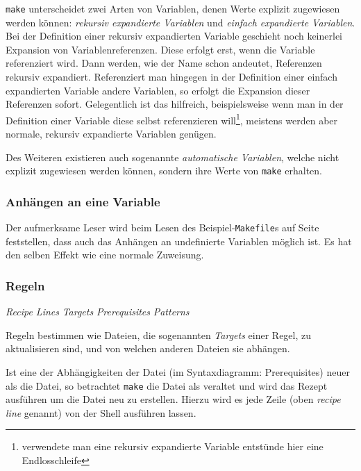 	\texttt{make} unterscheidet zwei Arten von Variablen, denen Werte
	explizit zugewiesen werden können: \emph{rekursiv expandierte Variablen}
	und \emph{einfach expandierte Variablen}.
	Bei der Definition einer rekursiv expandierten Variable geschieht noch
	keinerlei Expansion von Variablenreferenzen. Diese erfolgt erst, wenn
	die Variable referenziert wird. Dann werden, wie der Name schon
	andeutet, Referenzen rekursiv expandiert.
	Referenziert man hingegen in der Definition einer einfach expandierten
	Variable andere Variablen, so erfolgt die Expansion dieser Referenzen
	sofort. Gelegentlich ist das hilfreich, beispielsweise wenn man in der
	Definition einer Variable diese selbst referenzieren
	will\footnote{verwendete man eine rekursiv expandierte Variable
	entstünde hier eine Endlosschleife}, meistens werden aber normale,
	rekursiv expandierte Variablen genügen.
	
	Des Weiteren existieren auch sogenannte \emph{automatische Variablen},
	welche nicht explizit zugewiesen werden können, sondern ihre Werte von
	\texttt{make} erhalten.
%
\subsubsection*{Anhängen an eine Variable}

	
	Der aufmerksame Leser wird beim Lesen des Beispiel-\texttt{Makefile}s
	auf Seite~\pageref{subsubsection:examplemakefile} feststellen, dass
	auch das Anhängen an undefinierte Variablen möglich ist. Es hat den
	selben Effekt wie eine normale Zuweisung.

\subsubsection*{Regeln}
	
	\textit{Recipe Lines} 
	\textit{Targets} 
	\textit{Prerequisites} 
	\textit{Patterns} 

	Regeln bestimmen wie Dateien, die sogenannten \emph{Targets} einer
	Regel, zu aktualisieren sind, und von welchen anderen Dateien sie abhängen.
	
	Ist eine der Abhängigkeiten der Datei (im Syntaxdiagramm: Prerequisites)
	neuer als die Datei, so betrachtet \texttt{make} die Datei als veraltet
	und wird das Rezept ausführen um die Datei neu zu erstellen. Hierzu wird
	es jede Zeile (oben \textit{recipe line} genannt) von der Shell
	ausführen lassen.


